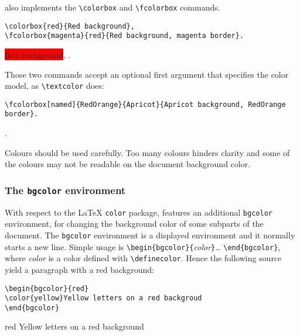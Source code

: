 %
\hevea{} also implements the \verb+\colorbox+ and \verb+\fcolorbox+ commands.
\begin{verbatim}
\colorbox{red}{Red background},
\fcolorbox{magenta}{red}{Red background, magenta border}.
\end{verbatim}
\begin{center}
\colorbox{red}{Red background},
.
\end{center}
Those two commands accept an optional first argument that specifies
the color model, as \verb+\textcolor+ does:
\begin{verbatim}
\fcolorbox[named]{RedOrange}{Apricot}{Apricot background, RedOrange border}.
\end{verbatim}
\begin{center}
.
\end{center}

Colours should be used carefully. Too many colours
hinders clarity and some of the colours may not be readable on the
document background color.

\subsubsection{The \texttt{bgcolor} environment}
\label{bgcolor}
With respect to the \LaTeX{} \texttt{color} package, \hevea{} features
an additional
\texttt{bgcolor} environment, for changing the background color of some
subparts of the document.
The \texttt{bgcolor} environment is a displayed environment and it
normally starts a new line.
Simple usage is \verb+\begin{bgcolor}{+\textit{color}\verb+}+\ldots{}
\verb+\end{bgcolor}+, where
\textit{color} is a color defined with \verb+\definecolor+.
Hence the following source yield a paragraph with a red background:
\begin{verbatim}
\begin{bgcolor}{red}
\color{yellow}Yellow letters on a red backgroud
\end{bgcolor}
\end{verbatim}
\begin{htmlonly}
\begin{bgcolor}{red}
\color{yellow}Yellow letters on a red background
\end{bgcolor}
\end{htmlonly}

